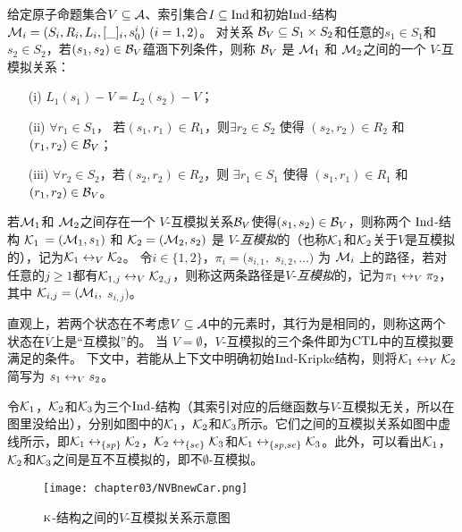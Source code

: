 \begin{definition}[$V$-互模拟]
	\label{def:VInd:bisimulation}
	给定原子命题集合$V\subseteq\cal A$、索引集合$I\subseteq \textrm{Ind}$和初始$\textrm{Ind}$-结构 ${\cal M}_i=(S_i, R_i,L_i, [\_]_i, s_0^i)~(i=1,2)$。
	对关系 ${\cal B}_V \subseteq S_1 \times S_2$和任意的$s_1 \in S_1$和$s_2 \in S_2$，若$(s_1, s_2)\in {\cal B}_V$蕴涵下列条件，则称 ${\cal B}_V$ 是 ${\cal M}_1$ 和 ${\cal M}_2$之间的一个 $V$-互模拟关系：
	\begin{itemize}
		\item[(i)] $L_1(s_1) - V = L_2(s_2) -V$；
		\item[(ii)] $\forall r_1\in S_1$， 若$(s_1, r_1)\in R_1$，则$\exists r_2 \in S_2$ 使得 $(s_2,r_2) \in R_2$ 和 $(r_1, r_2) \in {\cal B}_V$；
		\item[(iii)] $\forall r_2\in S_2$，若$(s_2, r_2)\in R_2$，则 $\exists r_1 \in S_1$ 使得 $(s_1,r_1) \in R_1$ 和 $(r_1, r_2)\in {\cal B}_V$。
	\end{itemize}
\end{definition}


若${\cal M}_1$和 ${\cal M}_2$之间存在一个 $V$-互模拟关系${\cal B}_V$使得$(s_1, s_2)\in {\cal B}_V$，则称两个 $\textrm{Ind}$-结构 ${\cal K}_1$ $= ({\cal M}_1, s_1)$ 和 ${\cal K}_2 = ({\cal M}_2, s_2)$ 是 $V$-{\em 互模拟}的（也称${\cal K}_1$和${\cal K}_2$关于$V$是互模拟的），记为${\cal K}_1 \leftrightarrow_V {\cal K}_2$。
令$i\in \{1,2\}$，$\pi_i=(s_{i,1},$ $s_{i,2},\ldots)$ 为 ${\cal M}_i$ 上的路径，若对任意的$j \ge 1$都有$ {\cal K}_{1,j} \leftrightarrow_V {\cal K}_{2,j}$，则称这两条路径是$V$-{\em 互模拟}的，记为$\pi_1 \leftrightarrow_V \pi_2$，其中 ${\cal K}_{i,j}=({\cal M}_i,$ $s_{i,j})$。


直观上，若两个状态在不考虑$V\subseteq\cal A$中的元素时，其行为是相同的，则称这两个状态在$\overline{V}$上是“互模拟”的。
当 $V=\emptyset$，$V$-互模拟的三个条件即为$\textrm{CTL}$中的互模拟要满足的条件。
下文中，若能从上下文中明确初始$\textrm{Ind}$-Kripke结构，则将${\cal K}_1 \leftrightarrow_V {\cal K}_2$ 简写为 $s_1 \leftrightarrow_V s_2$。

\begin{example}\label{exam:vB}
	令${\cal K}_1$，${\cal K}_2$和${\cal K}_3$为三个$\textrm{Ind}$-结构（其索引对应的后继函数与$V$-互模拟无关，所以在图里没给出），分别如图中的${\cal K}_1$，${\cal K}_2$和${\cal K}_3$所示。它们之间的互模拟关系如图中虚线所示，即${\cal K}_1 \leftrightarrow_{\{sp\}} {\cal K}_2$，${\cal K}_2 \leftrightarrow_{\{se\}} {\cal K}_3$和${\cal K}_1 \leftrightarrow_{\{sp,se\}} {\cal K}_3$。此外，可以看出${\cal K}_1$，${\cal K}_2$和${\cal K}_3$之间是互不互模拟\cite{Baier:PMC:2008}的，即不$\emptyset$-互模拟。
	\begin{figure*}[!htb]
		\centering
		\texttt{[image: chapter03/NVBnewCar.png]}\\
		\caption{$\textsc{k}$-结构之间的$V$-互模拟关系示意图}
		\label{Fig:chapter04:v1uv2}
	\end{figure*}
\end{example}



